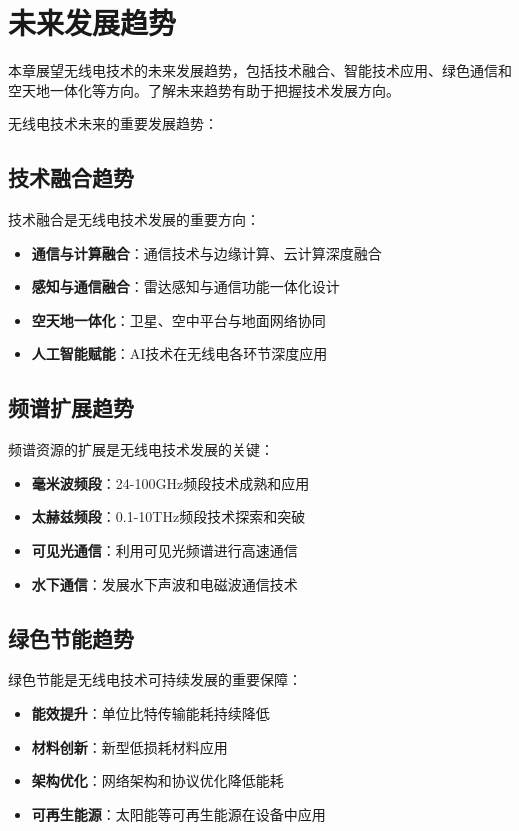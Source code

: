 \documentclass[12pt,UTF8]{ctexbook}
\begin{document}
\chapter{未来发展趋势}

本章展望无线电技术的未来发展趋势，包括技术融合、智能技术应用、绿色通信和空天地一体化等方向。了解未来趋势有助于把握技术发展方向。

无线电技术未来的重要发展趋势：

\section{技术融合趋势}

技术融合是无线电技术发展的重要方向：

\begin{itemize}[leftmargin=3.5em]
    \item \textbf{通信与计算融合}：通信技术与边缘计算、云计算深度融合
    \item \textbf{感知与通信融合}：雷达感知与通信功能一体化设计
    \item \textbf{空天地一体化}：卫星、空中平台与地面网络协同
    \item \textbf{人工智能赋能}：AI技术在无线电各环节深度应用
\end{itemize}

\section{频谱扩展趋势}

频谱资源的扩展是无线电技术发展的关键：

\begin{itemize}[leftmargin=3.5em]
    \item \textbf{毫米波频段}：24-100GHz频段技术成熟和应用
    \item \textbf{太赫兹频段}：0.1-10THz频段技术探索和突破
    \item \textbf{可见光通信}：利用可见光频谱进行高速通信
    \item \textbf{水下通信}：发展水下声波和电磁波通信技术
\end{itemize}

\section{绿色节能趋势}

绿色节能是无线电技术可持续发展的重要保障：

\begin{itemize}[leftmargin=3.5em]
    \item \textbf{能效提升}：单位比特传输能耗持续降低
    \item \textbf{材料创新}：新型低损耗材料应用
    \item \textbf{架构优化}：网络架构和协议优化降低能耗
    \item \textbf{可再生能源}：太阳能等可再生能源在设备中应用
\end{itemize}
\end{document}

